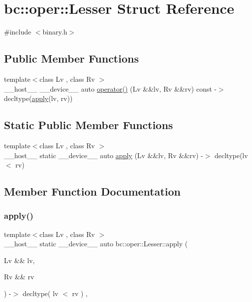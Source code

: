 \hypertarget{structbc_1_1oper_1_1Lesser}{}\section{bc\+:\+:oper\+:\+:Lesser Struct Reference}
\label{structbc_1_1oper_1_1Lesser}


{\ttfamily \#include $<$binary.\+h$>$}

\subsection*{Public Member Functions}
\begin{DoxyCompactItemize}
\item 
{\footnotesize template$<$class Lv , class Rv $>$ }\\\+\_\+\+\_\+host\+\_\+\+\_\+ \+\_\+\+\_\+device\+\_\+\+\_\+ auto \hyperlink{structbc_1_1oper_1_1Lesser_a721284f1f0fc95248cf7e18c2666f3d9}{operator()} (Lv \&\&lv, Rv \&\&rv) const -\/$>$ decltype(\hyperlink{structbc_1_1oper_1_1Lesser_aac961b96c6338178a9bfef611ce4b794}{apply}(lv, rv))
\end{DoxyCompactItemize}
\subsection*{Static Public Member Functions}
\begin{DoxyCompactItemize}
\item 
{\footnotesize template$<$class Lv , class Rv $>$ }\\\+\_\+\+\_\+host\+\_\+\+\_\+ static \+\_\+\+\_\+device\+\_\+\+\_\+ auto \hyperlink{structbc_1_1oper_1_1Lesser_aac961b96c6338178a9bfef611ce4b794}{apply} (Lv \&\&lv, Rv \&\&rv) -\/$>$ decltype(lv$<$ rv)
\end{DoxyCompactItemize}


\subsection{Member Function Documentation}
\mbox{\label{structbc_1_1oper_1_1Lesser_aac961b96c6338178a9bfef611ce4b794}} 
\subsubsection{\texorpdfstring{apply()}{apply()}}
{\footnotesize\ttfamily template$<$class Lv , class Rv $>$ \\
\+\_\+\+\_\+host\+\_\+\+\_\+ static \+\_\+\+\_\+device\+\_\+\+\_\+ auto bc\+::oper\+::\+Lesser\+::apply (\begin{DoxyParamCaption}\item[{Lv \&\&}]{lv,  }\item[{Rv \&\&}]{rv }\end{DoxyParamCaption}) -\/$>$ decltype( lv $<$ rv ) \hspace{0.3cm}{\ttfamily [inline]}, {\ttfamily [static]}}

